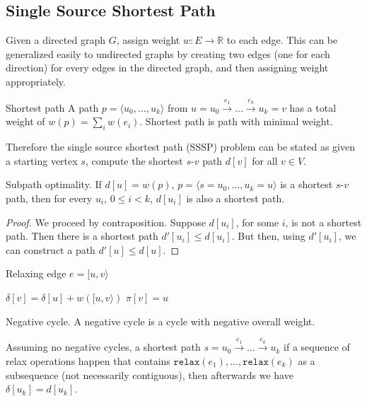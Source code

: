 \subsection{Single Source Shortest Path}
Given a directed graph $G$, assign weight $w: E\rightarrow\mathbb{R}$ to each
edge.  This can be generalized easily to undirected graphs by creating two
edges (one for each direction) for every edges in the directed graph, and then
assigning weight appropriately.
\begin{definition}{Shortest path}
  A path $p=\langle u_0,\ldots,u_k\rangle$ from
  $u=u_0\xrightarrow{e_1}\ldots\xrightarrow{e_k} u_k=v$ has a total weight of
  $w(p)=\sum_i w(e_i)$.  Shortest path is path with minimal weight.
\end{definition}

Therefore the single source shortest path (SSSP) problem can be stated as given
a starting vertex $s$, compute the shortest $s$-$v$ path $d[v]$ for all $v\in
V$.

\begin{theorem}{Subpath optimality.}
  \label{graph:subpath-optimality}
  If $d[u]=w(p)$, $p=\langle s=u_0,\ldots,u_k=u\rangle$ is a shortest $s$-$v$
  path, then for every $u_i$, $0\leq i<k$, $d[u_i]$ is also a shortest path.
\end{theorem}
\begin{proof}
  We proceed by contraposition.  Suppose $d[u_i]$, for some $i$, is not
  a shortest path.  Then there is a shortest path $d'[u_i]\leq d[u_i]$.  But
  then, using $d'[u_i]$, we can construct a path $d'[u]\leq d[u]$.
\end{proof}

\begin{algorithm}
  \caption{Relaxing edge $e=[u,v\rangle$}\label{graph:edge-relax}
  \begin{algorithmic}
      \If{$\delta[u]+w([u,v\rangle)<\delta[v]$}
      \State $\delta[v]=\delta[u]+w([u,v\rangle)$
      \State $\pi[v]=u$
      \EndIf
    \EndFunction
  \end{algorithmic}
\end{algorithm}

\begin{definition}{Negative cycle.}
  A negative cycle is a cycle with negative overall weight.
\end{definition}

\begin{lemma}
  \label{graph:relax}
  Assuming no negative cycles, a shortest path
  $s=u_0\xrightarrow{e_1}\ldots\xrightarrow{e_k}u_k$ if a sequence of relax
  operations happen that contains
  $\texttt{relax}(e_1),\ldots,\texttt{relax}(e_k)$ as a subsequence (not
  necessarily contiguous), then afterwards we have $\delta[u_k]=d[u_k]$.
\end{lemma}

